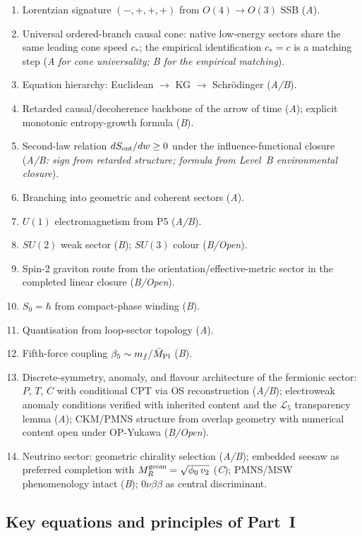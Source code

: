 \documentclass[11pt,a4paper]{article}
\begin{document}
\begin{enumerate}
\item Lorentzian signature $(-,+,+,+)$ from $O(4)\to O(3)$ SSB (\emph{A}).
\item Universal ordered-branch causal cone: native low-energy sectors share the same leading cone speed $c_*$; the empirical identification $c_*=c$ is a matching step (\emph{A for cone universality; B for the empirical matching}).
\item Equation hierarchy: Euclidean $\to$ KG $\to$ Schr\"odinger (\emph{A/B}).
\item Retarded causal/decoherence backbone of the arrow of time (\emph{A}); explicit monotonic entropy-growth formula (\emph{B}).
\item Second-law relation $dS_{\rm ent}/dw \geq 0$ under the influence-functional closure (\emph{A/B: sign from retarded structure; formula from Level~B environmental closure}).
\item Branching into geometric and coherent sectors (\emph{A}).
\item $U(1)$ electromagnetism from P5 (\emph{A/B}).
\item $SU(2)$ weak sector (\emph{B}); $SU(3)$ colour (\emph{B/Open}).
\item Spin-2 graviton route from the orientation/effective-metric sector in the completed linear closure (\emph{B/Open}).
\item $S_0 = \hbar$ from compact-phase winding (\emph{B}).
\item Quantisation from loop-sector topology (\emph{A}).
\item Fifth-force coupling $\beta_5 \sim m_f/\bar{M}_{\rm Pl}$ (\emph{B}).
\item Discrete-symmetry, anomaly, and flavour architecture of the fermionic sector: $P$, $T$, $C$ with conditional CPT via OS reconstruction (\emph{A/B}); electroweak anomaly conditions verified with inherited content and the $\mathcal{L}_5$ transparency lemma (\emph{A}); CKM/PMNS structure from overlap geometry with numerical content open under OP-Yukawa (\emph{B/Open}).
\item Neutrino sector: geometric chirality selection (\emph{A/B}); embedded seesaw as preferred completion with $M_R^{\rm geom}=\sqrt{\phi_0\,v_2}$ (\emph{C}); PMNS/MSW phenomenology intact (\emph{B}); $0\nu\beta\beta$ as central discriminant.
\end{enumerate}

\subsection{Key equations and principles of Part~I}
\end{document}
